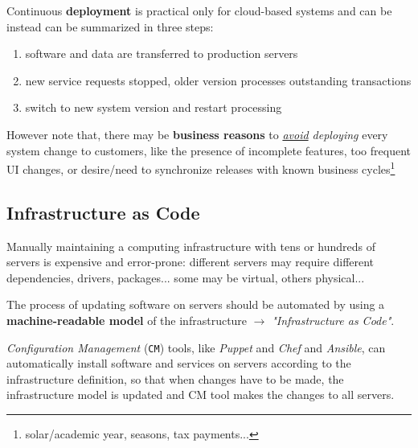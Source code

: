 Continuous \textbf{deployment} is practical only for cloud-based systems and can be instead can be summarized in three steps:
\begin{enumerate}
   \item software and data are transferred to
   production servers
   \item new service requests stopped, older
   version processes outstanding
   transactions
   \item switch to new system version and
   restart processing
\end{enumerate}

However note that, there may be \textbf{business reasons} to \textit{\underline{avoid} deploying} every system change to customers,
like the presence of incomplete features, too frequent UI changes, or desire/need to synchronize releases with known business cycles\footnote{solar/academic year, seasons, tax payments...}

\subsection{Infrastructure as Code}
Manually maintaining a computing infrastructure with tens or
hundreds of servers is expensive and error-prone:
different servers may require different dependencies, drivers, packages... some may be virtual, others physical...

The process of updating software on servers should be automated by using a \textbf{machine-readable model} of the infrastructure $\longrightarrow$ \textit{"Infrastructure as Code"}.

\textit{Configuration Management} (\texttt{CM}) tools, like
\textit{Puppet} and \textit{Chef} and \textit{Ansible}, can
automatically install software and services
on servers according to the infrastructure
definition, so that when changes have to be made,
the infrastructure model is updated and CM tool makes the changes to all servers.

